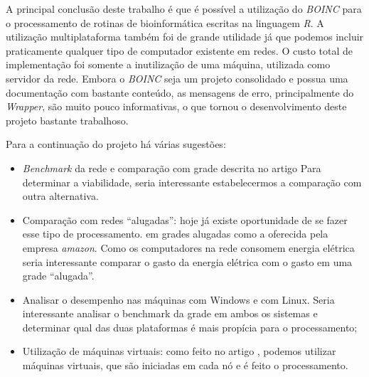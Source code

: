 
A principal conclusão deste trabalho é que é possível a utilização do \emph{BOINC} para o processamento
de rotinas de bioinformática escritas na linguagem \emph{R}. A utilização multiplataforma
também foi de grande utilidade já que podemos incluir praticamente qualquer tipo de computador 
existente em redes. O custo total de implementação foi somente a inutilização de uma máquina, utilizada
como servidor da rede. Embora o \emph{BOINC} seja um projeto consolidado e possua uma documentação com bastante conteúdo,
as mensagens de erro, principalmente do \emph{Wrapper}, são muito pouco informativas, o que tornou o desenvolvimento 
deste projeto bastante trabalhoso.

Para a continuação do projeto há várias sugestões:

\begin{itemize}
  \item \emph{Benchmark} da rede e comparação com grade descrita no artigo \cite{Dias}
Para determinar a viabilidade, seria interessante estabelecermos a comparação com outra 
alternativa. 
  \item Comparação com redes ``alugadas'': hoje já existe oportunidade de se fazer esse tipo de processamento.
em grades alugadas como a oferecida pela empresa \emph{amazon}. Como os computadores na rede 
consomem energia elétrica seria interessante comparar o gasto da energia elétrica com o gasto em 
uma grade ``alugada''.
  \item Analisar o desempenho nas máquinas com Windows e com Linux. Seria interessante analisar 
o benchmark da grade em ambos os sistemas e determinar qual das duas plataformas é mais
propícia para o processamento;
  \item Utilização de máquinas virtuais: como feito no artigo \cite{boinc}, podemos utilizar
máquinas virtuais, que são iniciadas em cada nó e é feito o processamento. 
\end{itemize}


